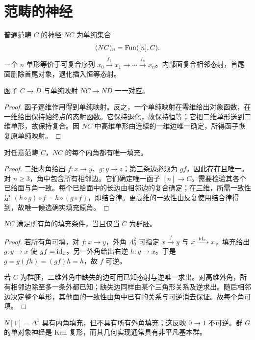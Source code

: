 \section{范畴的神经}
\begin{definition}[神经]
普通范畴 $C$ 的神经 $NC$ 为单纯集合
\[
(NC)_n=\operatorname{Fun}([n],C).
\]
一个 $n$-单形等价于可复合序列
$x_0\xrightarrow{f_1}x_1\to\cdots\xrightarrow{f_n}x_n$。内部面复合相邻态射，首尾面删除首尾对象，退化插入恒等态射。
\end{definition}
\begin{proposition}[神经的全忠实性]
函子 $C\to D$ 与单纯映射 $NC\to ND$ 一一对应。
\end{proposition}
\begin{proof}
函子逐维作用得到单纯映射。反之，一个单纯映射在零维给出对象函数，在一维给出保持始终点的态射函数。它保持退化，故保持恒等；它把二维单形送到二维单形，故保持复合。因 $NC$ 中高维单形由连续的一维边唯一确定，所得函子恢复原单纯映射。
\end{proof}
\begin{proposition}[神经的内角填充]
对任意范畴 $C$，$NC$ 的每个内角都有唯一填充。
\end{proposition}
\begin{proof}
二维内角给出 $f:x\to y$、$g:y\to z$；第三条边必须为 $gf$，因此存在且唯一。对 $n\ge3$，角中包含所有相邻边。它们确定唯一函子 $[n]\to C$。需要检验其各个已给面与角一致。每个已给面中的长边由相邻边的复合确定；在三维，所需一致性是 $(h\circ g)\circ f=h\circ(g\circ f)$，即结合律。更高维的一致性由反复使用结合律得到，故唯一候选确实填充原角。
\end{proof}
\begin{theorem}[群胚的神经判据]
$NC$ 满足所有角的填充条件，当且仅当 $C$ 为群胚。
\end{theorem}
\begin{proof}
若所有角可填，对 $f:x\to y$，外角 $\Lambda_0^2$ 可指定 $x\xrightarrow f y$ 与 $x\xrightarrow{\operatorname{id}_x}x$，填充给出 $g:y\to x$ 使 $gf=\operatorname{id}_x$。另一外角给出右逆 $h:y\to x$。于是 $g=g(fh)=(gf)h=h$，故 $f$ 可逆。

若 $C$ 为群胚，二维外角中缺失的边可用已知态射与逆唯一求出。对高维外角，所有相邻边除至多一条外都已知；缺失边同样由某个三角形关系及逆求出。随后相邻边决定整个单形，其他面的一致性由角中已有的关系与可逆消去保证。故每个角可填。
\end{proof}
\begin{example}
$N[1]=\Delta^1$ 具有内角填充，但不具有所有外角填充；这反映 $0\to1$ 不可逆。群 $G$ 的单对象神经是 Kan 复形，而其几何实现通常具有非平凡基本群。
\end{example}
